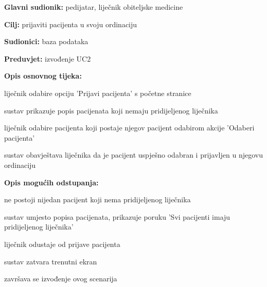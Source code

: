                     \noindent {}
					\begin{packed_item}
	
						\item \textbf{Glavni sudionik: }pedijatar, liječnik obiteljske medicine
						\item  \textbf{Cilj:} prijaviti pacijenta u svoju ordinaciju
						\item  \textbf{Sudionici:} baza podataka
						\item  \textbf{Preduvjet:} izvođenje UC2
						\item  \textbf{Opis osnovnog tijeka:}
						
						\item[] \begin{packed_enum}
							\item liječnik odabire opciju 'Prijavi pacijenta' s početne stranice
							\item sustav prikazuje popis pacijenata koji nemaju pridijeljenog liječnika
							\item liječnik odabire pacijenta koji postaje njegov pacijent odabirom akcije 'Odaberi pacijenta'
							\item sustav obavještava liječnika da je pacijent uspješno odabran i prijavljen u njegovu ordinaciju

						\end{packed_enum}
						
						\item  \textbf{Opis mogućih odstupanja:}
						
						\item[] \begin{packed_item}
	
							\item[2.a] ne postoji nijedan pacijent koji nema pridijeljenog liječnika
							\item[] \begin{packed_enum}
								\item sustav umjesto popisa pacijenata, prikazuje poruku 'Svi pacijenti imaju pridijeljenog liječnika'
							\end{packed_enum}
							\item[3.a] liječnik odustaje od prijave pacijenta
							\item[] \begin{packed_enum}
								\item sustav zatvara trenutni ekran
								\item završava se izvođenje ovog scenarija
							\end{packed_enum}
							
						\end{packed_item}
					\end{packed_item}

